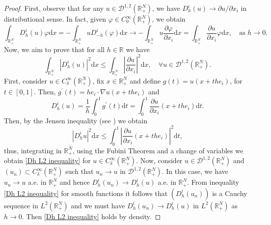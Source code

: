 \documentclass[12pt,reqno]{amsart}
\begin{document}
\begin{proof} First, observe that for any $u\in \mathcal{D}^{1,2}(\mathds{R}^N_+)$, we have $D_h^i(u)\longrightarrow \partial u/\partial x_i$ in distributional sense. In fact, given $\varphi \in C^\infty_0(\mathds{R}^N_+)$, we obtain
\begin{equation*}
    \int_{\mathds{R}^N_+}D_h^i(u)\varphi\mathrm{d}x=- \int_{\mathds{R}^N_+}uD_{-h}^i(\varphi)\mathrm{d}x\longrightarrow -\int_{\mathds{R}^N_+}u\frac{\partial\varphi}{\partial x_i}\mathrm{d}x= \int_{\mathds{R}^N_+}\frac{\partial u}{\partial x_i}\varphi \mathrm{d}x,\quad \text{as $h\longrightarrow 0$}.
\end{equation*}
Now, we aim to prove that for all $h\in \mathds{R}$ we have
\begin{equation}\label{Dh L2 inequality}
\int_{\mathds{R}^N_+}|D_h^i(u)|^2\mathrm{d}x\leq \int_{\mathds{R}^N_+}\left|\frac{\partial u}{\partial x_i}\right|^2\mathrm{d}x, \quad \forall u\in \mathcal{D}^{1,2}(\mathds{R}^N_+).
\end{equation}
First, consider $u\in C^\infty_\delta(\mathds{R}^N_+)$, fix $x\in \mathds{R}^N_+$ and define $g(t)=u(x+the_i)$, for $t \in [0,1]$. Then, $g^\prime(t)=he_i \cdot\nabla u(x+the_i)$ and
\begin{equation*}
    D_h^i(u)=\frac{1}{h}\int_0^1 g^\prime(t)\mathrm{d}t=\int_0^1 \frac{\partial u}{\partial x_i}(x+the_i)\mathrm{d}t.
\end{equation*}
 Then, by the Jensen inequality (see \cite[Theorem 3.3]{Rudin}) we obtain
 \begin{equation*}
|D_h^i u|^2\mathrm{d}x\leq \int_0^1 \left|\frac{\partial u}{\partial x_i}(x+the_i)\right|^2\mathrm{d}t,
 \end{equation*}
thus, integrating in $\mathds{R}^N_+$, using the Fubini Theorem and a change of variables we obtain 
\eqref{Dh L2 inequality} for $u\in C^\infty_\delta(\mathds{R}^N_+)$. Now, consider $u\in \mathcal{D
}^{1,2}(\mathds{R}^N_+)$ and $(u_n)\subset C^\infty_\delta(\mathds{R}^N_+)$ such that $u_n \longrightarrow u$ in $\mathcal{D}^{1,2}(\mathds{R}^N_+)$. In this case, we have $u_n\longrightarrow u$ a.e. in $\mathds{R}^N_+$ and hence $D_h^i(u_n)\longrightarrow D_h^i(u)$ a.e. in $\mathds{R}^N_+$. From inequality \eqref{Dh L2 inequality} for smooth functions it follows that $(D_h^i(u_n))$ is a Cauchy sequence in $L^2(\mathds{R}^N_+)$ and we must have $D_h^i(u_n)\longrightarrow D_h^i(u)$ in $L^2(\mathds{R}^N_+)$ as $h\longrightarrow 0$. Then \eqref{Dh L2 inequality} holds by density.


\end{proof}
\end{document}
